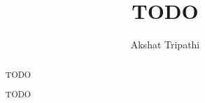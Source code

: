 \documentclass[a4paper, twoside]{report}
\title{TODO}
\author{Akshat Tripathi}
\begin{document}


\begin{abstract}
TODO
\end{abstract}

\renewcommand{\abstractname}{Acknowledgements}
\begin{abstract}
TODO
\end{abstract}

\tableofcontents
\listoffigures
\listoftables











\end{document}
